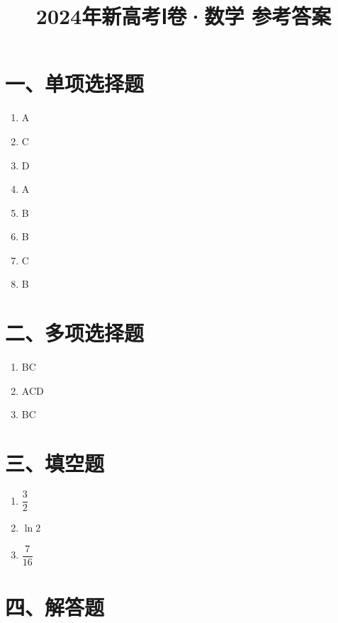 \documentclass[12pt,a4paper]{article}
\title{2024年新高考Ⅰ卷·数学 参考答案}
\date{}
\begin{document}
\maketitle

\section*{一、单项选择题}

\begin{enumerate}[label=\arabic*.]
\item A
\item C
\item D
\item A
\item B
\item B
\item C
\item B
\end{enumerate}

\section*{二、多项选择题}

\begin{enumerate}[label=\arabic*.]
\item BC
\item ACD
\item BC
\end{enumerate}

\section*{三、填空题}

\begin{enumerate}[label=\arabic*.]
\item $\dfrac{3}{2}$
\item $\ln 2$
\item $\dfrac{7}{16}$
\end{enumerate}

\section*{四、解答题}
\end{document}
